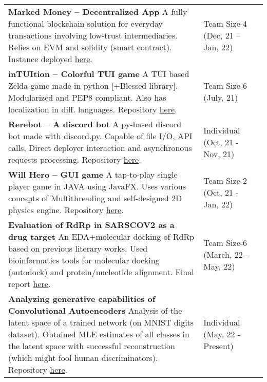 \documentclass[10pt]{extarticle}
\begin{document}
\vspace{0pt}
\begin{contained}
\begin{longtable}{p{}p{}p{}}
    \textbf{Marked Money – Decentralized App}\newline
    A fully functional blockchain solution for everyday transactions
    involving low-trust intermediaries. Relies on EVM and solidity (smart contract).
    Instance deployed \href{https://macaroon.web.app/}{here}.
    &Team Size-4
    \newline (Dec, 21 – Jan, 22)\\
    \textbf{inTUItion – Colorful TUI game}\newline
    A TUI based Zelda game made in python [+Blessed library]. Modularized and PEP8 compliant. Also has localization in diff. languages. Repository \href{https://github.com/StephD/CJ8-blessed-badgers}{here}.
    &Team Size-6
    \newline (July, 21)\\
    \textbf{Rerebot – A discord bot}\newline
    A py-based discord bot made with discord.py. Capable of file I/O, API calls, Direct deployer interaction and asynchronous requests processing. Repository \href{https://github.com/Anindya-Prithvi/rerebot}{here}.
    &Individual
    \newline (Oct, 21 - Nov, 21)\\
    \textbf{Will Hero – GUI game}\newline
    A tap-to-play single player game in JAVA using JavaFX. Uses various
    concepts of Multithreading and self-designed 2D physics engine. Repository \href{https://github.com/vibsterD/CSE201-AP-Project}{here}.
    &Team Size-2
    \newline (Oct, 21 - Jan, 22)\\
    \textbf{Evaluation of RdRp in SARSCOV2 as a drug target}\newline
    An EDA+molecular docking of RdRp based on previous literary works. Used
    bioinformatics tools for molecular docking (autodock) and protein/nucleotide
    alignment. Final report \href{https://anindya-prithvi.github.io/filehost/PB_Project.pdf}{here}.
    &Team Size-6
    \newline (March, 22 - May, 22)\\
    \textbf{Analyzing generative capabilities of Convolutional Autoencoders}\newline
    Analysis of the latent space of a trained network (on MNIST digits dataset). Obtained MLE estimates of all classes in the latent space with successful reconstruction (which might fool human discriminators). Repository \href{https://github.com/Anindya-Prithvi/MNIST_CAELatentSpace}{here}.
    &Individual
    \newline (May, 22 - Present)\\
\end{longtable}
\end{contained}
\end{document}
